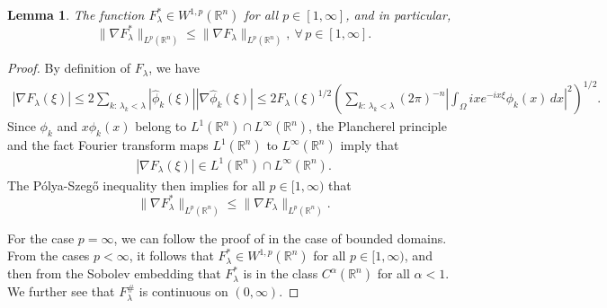 \documentclass[11pt,twoside, leqno]{article}
\def\rr{{\mathbb R}}
\def\rn{{{\rr}^n}}
\newtheorem{lem}[thm]{Lemma}
\numberwithin{equation}{section}
\begin{document}
\begin{lem}\label{lem-1}
The function $F_\lambda^\ast\in W^{1,p}(\rn)$ for all $p\in [1,\infty]$, and in particular,
$$\|\nabla F_\lambda^\ast\|_{L^p(\rn)}\le \|\nabla F_\lambda\|_{L^p(\rn)}, \ \forall\, p\in [1,\infty].$$
\end{lem}
\begin{proof}
By definition of $F_\lambda$, we have
\begin{align*}
|\nabla F_\lambda(\xi)|\le 2 \sum_{k:\,\lambda_k<\lambda} |\hat{\phi}_k(\xi)||\nabla \hat{\phi}_k(\xi) |\le 2F_\lambda(\xi)^{1/2} \left( \sum_{k:\,\lambda_k<\lambda} (2\pi)^{-n}\left|\int_\Omega ixe^{-ix\xi}\phi_k(x)\,dx\right|^2\right)^{1/2}.
\end{align*}
Since $\phi_k$ and $x\phi_k(x)$ belong to $L^1(\rn)\cap L^\infty(\rn)$, the Plancherel principle and the fact Fourier transform maps $L^1(\rn)$ to $L^\infty(\rn)$ imply that
\begin{align*}
|\nabla F_\lambda(\xi)|\in L^1(\rn)\cap L^\infty(\rn).
\end{align*}
The P\'olya-Szeg\H{o} inequality then implies  for all $p\in [1,\infty)$ that
$$\|\nabla F_\lambda^\ast\|_{L^p(\rn)}\le \|\nabla F_\lambda\|_{L^p(\rn)}.$$

For the case $p=\infty$, we can follow the proof of \cite[Theorem 2.3.2]{Kesa06} in the case of bounded domains.
From the cases $p<\infty$, it follows that $F_\lambda^\ast\in W^{1,p}(\rn)$ for all $p\in [1,\infty)$, and then from the Sobolev embedding that
$F_\lambda^\ast$ is in the class $C^\alpha(\rn)$ for all $\alpha<1$. We further see that
$F_\lambda^\#$ is continuous on $(0,\infty)$.


\end{proof}
\end{document}
